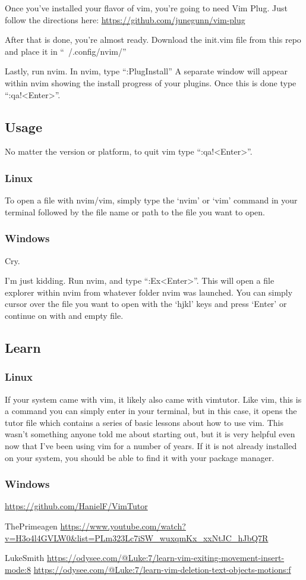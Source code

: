 \documentclass[12pt]{article}
\begin{document}
Once you've installed your flavor of vim, 
you're going to need Vim Plug.
Just follow the directions here:
\url{https://github.com/junegunn/vim-plug}

After that is done, you're almost ready.
Download the init.vim file from this repo and place it in 
``~/.config/nvim/''

Lastly, run nvim.
In nvim, type
``:PlugInstall''
A separate window will appear within nvim showing the install progress of your plugins. Once this is done type ``:qa!<Enter>''.

\subsection{Usage}

No matter the version or platform,
to quit vim type ``:qa!<Enter>''.


\subsubsection{Linux}
To open a file with nvim/vim, 
simply type the `nvim' or `vim' command in your terminal followed by the file name or path to the file you want to open.

\subsubsection{Windows}
Cry.


I'm just kidding. 
Run nvim, and type ``:Ex<Enter>''.
This will open a file explorer within nvim from whatever folder nvim was launched.
You can simply cursor over the file you want to open with the `hjkl' keys and press `Enter' or continue on with and empty file.


\subsection{Learn}

\subsubsection{Linux}
If your system came with vim, it likely also came with vimtutor.
Like vim, this is a command you can simply enter in your terminal, 
but in this case,
it opens the tutor file 
which contains a series of basic lessons about how to use vim.
This wasn't something anyone told me about starting out, 
but it is very helpful even now that I've been using vim for a number of years.
If it is not already installed on your system,
you should be able to find it with your package manager.

\subsubsection{Windows}
\url{https://github.com/HanielF/VimTutor}

ThePrimeagen
\url{https://www.youtube.com/watch?v=H3o4l4GVLW0&list=PLm323Lc7iSW_wuxqmKx_xxNtJC_hJbQ7R}

LukeSmith
\url{https://odysee.com/@Luke:7/learn-vim-exiting-movement-insert-mode:8}
\url{https://odysee.com/@Luke:7/learn-vim-deletion-text-objects-motions:f}
\end{document}
